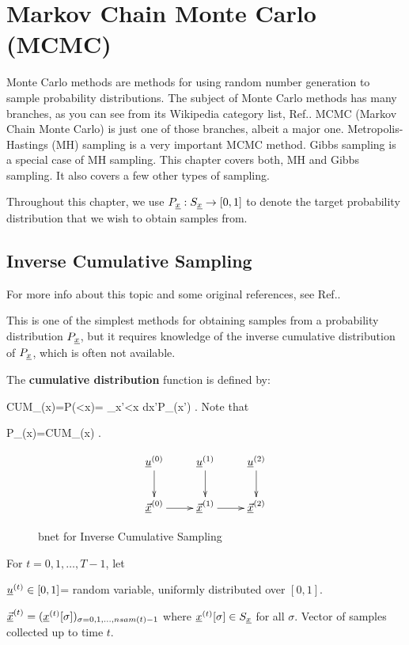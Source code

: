 \chapter{Markov Chain Monte Carlo (MCMC)}
\label{ch-mcmc}


Monte Carlo methods
are methods for using
 random number generation to
sample probability distributions.
The subject of Monte Carlo methods
has many branches, as you can see 
from its Wikipedia
category list, Ref.\cite{wiki-monte-carlo}.
MCMC (Markov
Chain Monte Carlo) is just one of those
branches, albeit a major one.
Metropolis-Hastings (MH) sampling
is a very important MCMC method.
Gibbs sampling is
a special case
of MH sampling.
This chapter covers both, MH and Gibbs sampling.
It also covers a few 
other types of sampling.

Throughout this chapter,
we use $P_{\underline{x}}:S_{\underline{x}}\rightarrow [0,1]$
to denote the target probability
distribution
that we wish to obtain samples from.


\section{Inverse Cumulative Sampling}
For more info about this topic 
and some original references, 
see Ref.\cite{wiki-inv-cum}.

This
is one of the simplest
methods for obtaining
samples from a probability 
distribution $P_{\underline{x}}$,
but it
requires knowledge
of the inverse
 cumulative distribution
of $P_{\underline{x}}$, which
is often not available.

The {\bf cumulative
distribution} function
is defined by:

\beq
CUM_\rvx(x)=P(\rvx<x)=
\int_{x'<x} dx'\;P_\rvx(x')
\;.
\eeq
Note that

\beq
P_\rvx(x)=CUM_\rvx(x)
\;.
\eeq


\begin{figure}[h!]
$$\xymatrix{
\rvu^{(0)}\ar[d]
&\rvu^{(1)}\ar[d]
&\rvu^{(2)}\ar[d]
\\
\ul{\vecx}^{(0)}\ar[r]
&\ul{\vecx}^{(1)}\ar[r]
&\ul{\vecx}^{(2)}
}$$
\caption{bnet for Inverse Cumulative Sampling}
\label{fig-mcmc-inverse-bnet}
\end{figure}

For $t=0, 1, \ldots, T-1$, let

${\underline{u}}^{(t)}\in [0,1]$= random variable, 
uniformly
distributed over $[0,1]$.

$\underline{{\vec{x}}}^{(t)}=({\underline{x}}^{(t)}[\sigma])_{\sigma=0,1, 
\ldots, nsam(t)-1}$
where ${\underline{x}}^{(t)}[\sigma] \in S_{\underline{x}}$ for all $\sigma$. 
Vector of samples collected 
up to time $t$.


